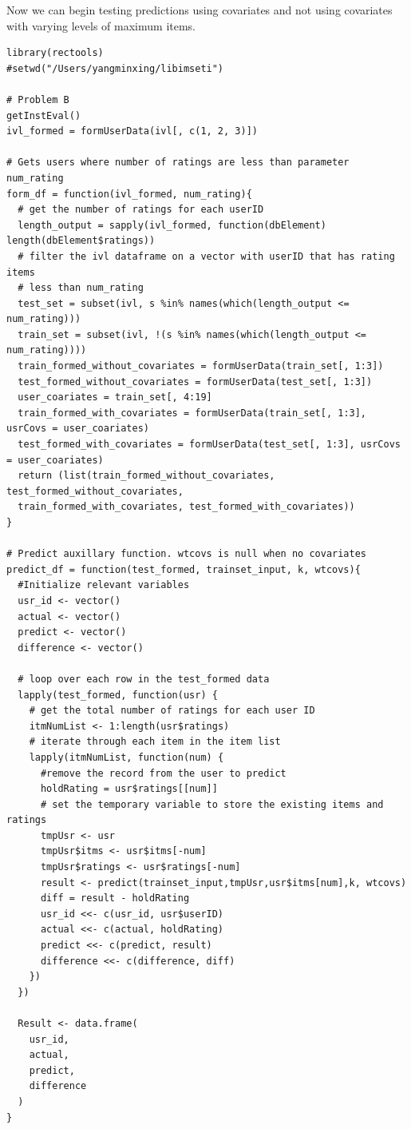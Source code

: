 \documentclass{article}
\begin{document}
Now we can begin testing predictions using covariates and not using covariates with varying levels of maximum items. 

\begin{verbatim}
library(rectools)
#setwd("/Users/yangminxing/libimseti")

# Problem B
getInstEval()
ivl_formed = formUserData(ivl[, c(1, 2, 3)])

# Gets users where number of ratings are less than parameter num_rating
form_df = function(ivl_formed, num_rating){
  # get the number of ratings for each userID
  length_output = sapply(ivl_formed, function(dbElement) length(dbElement$ratings))
  # filter the ivl dataframe on a vector with userID that has rating items 
  # less than num_rating
  test_set = subset(ivl, s %in% names(which(length_output <= num_rating)))
  train_set = subset(ivl, !(s %in% names(which(length_output <= num_rating))))
  train_formed_without_covariates = formUserData(train_set[, 1:3])
  test_formed_without_covariates = formUserData(test_set[, 1:3])
  user_coariates = train_set[, 4:19]
  train_formed_with_covariates = formUserData(train_set[, 1:3], usrCovs = user_coariates)
  test_formed_with_covariates = formUserData(test_set[, 1:3], usrCovs = user_coariates)
  return (list(train_formed_without_covariates, test_formed_without_covariates, 
  train_formed_with_covariates, test_formed_with_covariates))
}

# Predict auxillary function. wtcovs is null when no covariates
predict_df = function(test_formed, trainset_input, k, wtcovs){
  #Initialize relevant variables
  usr_id <- vector()
  actual <- vector()
  predict <- vector()
  difference <- vector()
  
  # loop over each row in the test_formed data
  lapply(test_formed, function(usr) {
    # get the total number of ratings for each user ID
    itmNumList <- 1:length(usr$ratings)
    # iterate through each item in the item list
    lapply(itmNumList, function(num) {
      #remove the record from the user to predict
      holdRating = usr$ratings[[num]] 
      # set the temporary variable to store the existing items and ratings
      tmpUsr <- usr
      tmpUsr$itms <- usr$itms[-num] 
      tmpUsr$ratings <- usr$ratings[-num] 
      result <- predict(trainset_input,tmpUsr,usr$itms[num],k, wtcovs)
      diff = result - holdRating
      usr_id <<- c(usr_id, usr$userID)
      actual <<- c(actual, holdRating)
      predict <<- c(predict, result)
      difference <<- c(difference, diff)
    })
  })
  
  Result <- data.frame(
    usr_id,
    actual,
    predict,
    difference
  )
}


\end{verbatim}
\end{document}
